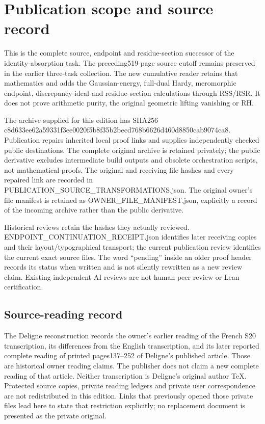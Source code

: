 \documentclass[
]{article}
\author{}
\date{}
\begin{document}
\section{Publication scope and source record}\label{publication-scope-and-source-record}

This is the complete source, endpoint and residue-section successor of the identity-absorption task. The preceding519-page source cutoff remains preserved in the earlier three-task collection. The new cumulative reader retains that mathematics and adds the Gaussian-energy, full-dual Hardy, meromorphic endpoint, discrepancy-ideal and residue-section calculations through RSS/RSR. It does not prove arithmetic purity, the original geometric lifting vanishing or RH.

The archive supplied for this edition has SHA256 c8d633ee62a59331f3ee0020f5b8f35b2becd768b6626d460d8850cab9074ca8. Publication repairs inherited local proof links and supplies independently checked public destinations. The complete original archive is retained privately; the public derivative excludes intermediate build outputs and obsolete orchestration scripts, not mathematical proofs. The original and receiving file hashes and every repaired link are recorded in PUBLICATION\_SOURCE\_TRANSFORMATIONS.json. The original owner's file manifest is retained as OWNER\_FILE\_MANIFEST.json, explicitly a record of the incoming archive rather than the public derivative.

Historical reviews retain the hashes they actually reviewed. ENDPOINT\_CONTINUATION\_RECEIPT.json identifies later receiving copies and their layout/typographical transport; the current publication review identifies the current exact source files. The word ``pending'' inside an older proof header records its status when written and is not silently rewritten as a new review claim. Existing independent AI reviews are not human peer review or Lean certification.

\subsection{Source-reading record}\label{source-reading-record}

The Deligne reconstruction records the owner's earlier reading of the French S20 transcription, its differences from the English transcription, and its later reported complete reading of printed pages137--252 of Deligne's published article. Those are historical owner reading claims. The publisher does not claim a new complete reading of that article. Neither transcription is Deligne's original author TeX. Protected source copies, private reading ledgers and private user correspondence are not redistributed in this edition. Links that previously opened those private files lead here to state that restriction explicitly; no replacement document is presented as the private original.
\end{document}
